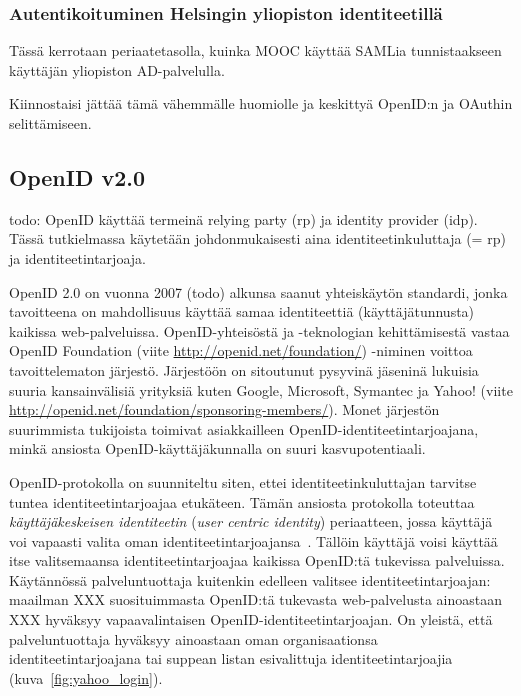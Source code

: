 \documentclass[finnish,gradu]{tktltiki}
\begin{document}


  \subsubsection{Autentikoituminen Helsingin yliopiston identiteetillä} %
  \label{sub:autentikoituminen_helsingin_yliopiston_käyttäjärekisteriin}
  Tässä kerrotaan periaatetasolla, kuinka MOOC käyttää SAMLia tunnistaakseen käyttäjän yliopiston AD-palvelulla.

  Kiinnostaisi jättää tämä vähemmälle huomiolle ja keskittyä OpenID:n ja OAuthin selittämiseen.




  \subsection{OpenID v2.0} %
  \label{sub:openid}

  todo: OpenID käyttää termeinä relying party (rp) ja identity provider (idp). Tässä tutkielmassa käytetään johdonmukaisesti aina identiteetinkuluttaja (= rp) ja identiteetintarjoaja.

  OpenID 2.0 on vuonna 2007 (todo) alkunsa saanut yhteiskäytön standardi, jonka tavoitteena on mahdollisuus käyttää samaa identiteettiä (käyttäjätunnusta) kaikissa web-palveluissa. OpenID-yhteisöstä ja -teknologian kehittämisestä vastaa OpenID Foundation (viite \url{http://openid.net/foundation/}) -niminen voittoa tavoittelematon järjestö. Järjestöön on sitoutunut pysyvinä jäseninä lukuisia suuria kansainvälisiä yrityksiä kuten Google, Microsoft, Symantec ja Yahoo! (viite \url{http://openid.net/foundation/sponsoring-members/}). Monet järjestön suurimmista tukijoista toimivat asiakkailleen OpenID-identiteetintarjoajana, minkä ansiosta OpenID-käyttäjäkunnalla on suuri kasvupotentiaali.

  OpenID-protokolla on suunniteltu siten, ettei identiteetinkuluttajan tarvitse tuntea identiteetintarjoajaa etukäteen. Tämän ansiosta protokolla toteuttaa \emph{käyttäjäkeskeisen identiteetin} (\emph{user centric identity}) periaatteen, jossa käyttäjä voi vapaasti valita oman identiteetintarjoajansa~\cite{openid_recordon_2009}. Tällöin käyttäjä voisi käyttää itse valitsemaansa identiteetintarjoajaa kaikissa OpenID:tä tukevissa palveluissa. Käytännössä palveluntuottaja kuitenkin edelleen valitsee identiteetintarjoajan: maailman XXX suosituimmasta OpenID:tä tukevasta web-palvelusta ainoastaan XXX hyväksyy vapaavalintaisen OpenID-identiteetintarjoajan. On yleistä, että palveluntuottaja hyväksyy ainoastaan oman organisaationsa identiteetintarjoajana tai suppean listan esivalittuja identiteetintarjoajia (kuva~\ref{fig:yahoo_login}).
\end{document}
